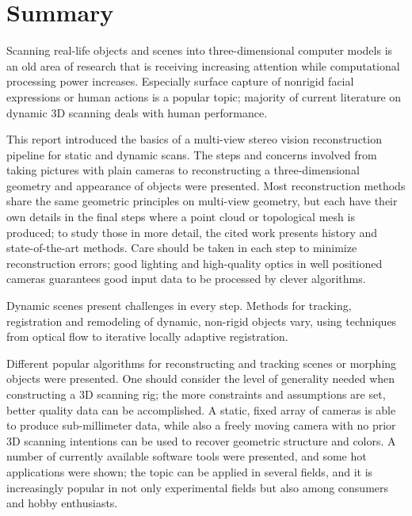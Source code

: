 \section{Summary}


Scanning real-life objects and scenes into three-dimensional computer models is an old area of research that is receiving increasing attention while computational processing power increases.
Especially surface capture of nonrigid facial expressions or human actions is a popular topic; majority of current literature on dynamic 3D scanning deals with human performance.

This report introduced the basics of a multi-view stereo vision reconstruction pipeline for static and dynamic scans.
The steps and concerns involved from taking pictures with plain cameras to reconstructing a three-dimensional geometry and appearance of objects were presented.
Most reconstruction methods share the same geometric principles on multi-view geometry, but each have their own details in the final steps where a point cloud or topological mesh is produced; to study those in more detail, the cited work presents history and state-of-the-art methods.
Care should be taken in each step to minimize reconstruction errors; good lighting and high-quality optics in well positioned cameras guarantees good input data to be processed by clever algorithms.

Dynamic scenes present challenges in every step. Methods for tracking, registration and remodeling of dynamic, non-rigid objects vary, using techniques from optical flow to iterative locally adaptive registration.

Different popular algorithms for reconstructing and tracking scenes or morphing objects were presented.
One should consider the level of generality needed when constructing a 3D scanning rig; the more constraints and assumptions are set, better quality data can be accomplished.
A static, fixed array of cameras is able to produce sub-millimeter data, while also a freely moving camera with no prior 3D scanning intentions can be used to recover geometric structure and colors.
A number of currently available software tools were presented, and some hot applications were shown; the topic can be applied in several fields, and it is increasingly popular in not only experimental fields but also among consumers and hobby enthusiasts.
